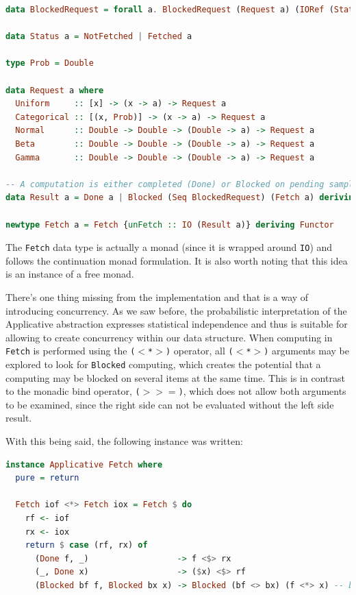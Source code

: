 \documentclass[
  oneside,
  11pt, a4paper,
  footinclude=true,
  headinclude=true,
  cleardoublepage=empty
]{scrbook}
\theoremstyle{definition}
\theoremstyle{definition}
\begin{document}
    \begin{lstlisting}[language=Haskell, caption={Fetch Data Type},captionpos=b]
data BlockedRequest = forall a. BlockedRequest (Request a) (IORef (Status a))

data Status a = NotFetched | Fetched a

type Prob = Double

data Request a where
  Uniform     :: [x] -> (x -> a) -> Request a
  Categorical :: [(x, Prob)] -> (x -> a) -> Request a
  Normal      :: Double -> Double -> (Double -> a) -> Request a
  Beta        :: Double -> Double -> (Double -> a) -> Request a
  Gamma       :: Double -> Double -> (Double -> a) -> Request a

-- A computation is either completed (Done) or Blocked on pending sample requests
data Result a = Done a | Blocked (Seq BlockedRequest) (Fetch a) deriving Functor

newtype Fetch a = Fetch {unFetch :: IO (Result a)} deriving Functor
    \end{lstlisting}
    
The \texttt{Fetch} data type is actually a monad (since it is wrapped around \texttt{IO}) and follows the continuation monad formulation. It is also worth noting that this idea is an instance of a free monad.

There's one thing missing from the implementation and that is a way of introducing concurrency. As we saw before, the probabilistic interpretation of the Applicative abstraction expresses statistical independence and thus is suitable for allowing to create concurrency within our data structure. When computing in \texttt{Fetch} is performed using the \texttt{($<$*$>$)} operator, all \texttt{($<$*$>$)} arguments may be explored to look for \texttt{Blocked} computing, which creates the potential that a computing may be blocked on several items at the same time. This is in contrast to the monadic bind operator, \texttt{($>>=$)}, which does not allow both arguments to be examined, since the right side can not be evaluated without the left side result.

With this being said, the following instance was written:

    \begin{lstlisting}[language=Haskell, caption={Fetch Applicative instance},captionpos=b]
instance Applicative Fetch where
  pure = return

  Fetch iof <*> Fetch iox = Fetch $ do
    rf <- iof
    rx <- iox
    return $ case (rf, rx) of
      (Done f, _)                  -> f <$> rx
      (_, Done x)                  -> ($x) <$> rf
      (Blocked bf f, Blocked bx x) -> Blocked (bf <> bx) (f <*> x) -- batching parallel requests
    \end{lstlisting}
    
\end{document}
